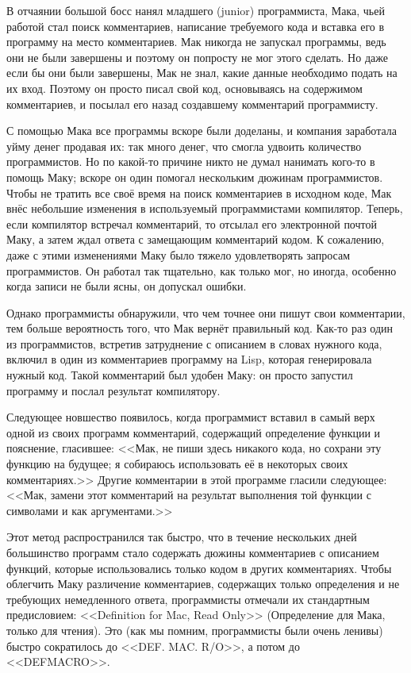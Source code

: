 В отчаянии большой босс нанял младшего (junior) программиста, Мака, чьей работой стал
поиск комментариев, написание требуемого кода и вставка его в программу на место
комментариев. Мак никогда не запускал программы, ведь они не были завершены и поэтому он
попросту не мог этого сделать. Но даже если бы они были завершены, Мак не знал, какие
данные необходимо подать на их вход. Поэтому он просто писал свой код, основываясь на
содержимом комментариев, и посылал его назад создавшему комментарий программисту.

С помощью Мака все программы вскоре были доделаны, и компания заработала уйму денег
продавая их: так много денег, что смогла удвоить количество программистов. Но по какой-то
причине никто не думал нанимать кого-то в помощь Маку; вскоре он один помогал нескольким
дюжинам программистов. Чтобы не тратить все своё время на поиск комментариев в исходном
коде, Мак внёс небольшие изменения в используемый программистами компилятор. Теперь, если
компилятор встречал комментарий, то отсылал его электронной почтой Маку, а затем ждал
ответа с замещающим комментарий кодом. К сожалению, даже с этими изменениями Маку было
тяжело удовлетворять запросам программистов. Он работал так тщательно, как только мог, но
иногда, особенно когда записи не были ясны, он допускал ошибки.

Однако программисты обнаружили, что чем точнее они пишут свои комментарии, тем больше
вероятность того, что Мак вернёт правильный код. Как-то раз один из программистов,
встретив затруднение с описанием в словах нужного кода, включил в один из комментариев
программу на Lisp, которая генерировала нужный код. Такой комментарий был удобен Маку: он
просто запустил программу и послал результат компилятору.

Следующее новшество появилось, когда программист вставил в самый верх одной из своих
программ комментарий, содержащий определение функции и пояснение, гласившее: <<Мак, не пиши
здесь никакого кода, но сохрани эту функцию на будущее; я собираюсь использовать её в
некоторых своих комментариях.>> Другие комментарии в этой программе гласили следующее:
<<Мак, замени этот комментарий на результат выполнения той функции с символами  и
 как аргументами.>>

Этот метод распространился так быстро, что в течение нескольких дней большинство программ
стало содержать дюжины комментариев с описанием функций, которые использовались только
кодом в других комментариях. Чтобы облегчить Маку различение комментариев, содержащих
только определения и не требующих немедленного ответа, программисты отмечали их
стандартным предисловием: <<Definition for Mac, Read Only>> (Определение для Мака, только
для чтения). Это (как мы помним, программисты были очень ленивы) быстро сократилось до
<<DEF. MAC. R/O>>, а потом до <<DEFMACRO>>.

